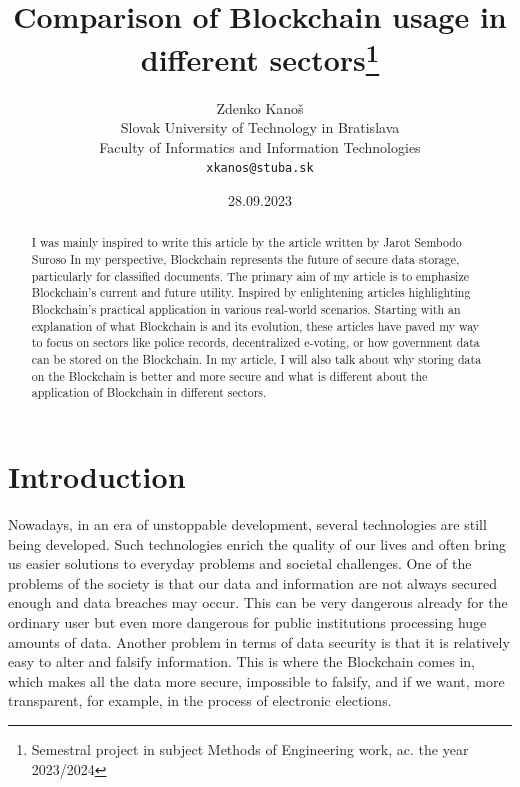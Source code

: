 \documentclass[10pt,english,a4paper]{article}
\title{Comparison of Blockchain usage in different sectors\centering\thanks{Semestral project in subject Methods of Engineering work, ac. the year 2023/2024}}
\author{Zdenko Kanoš\\[2pt]
	{\small Slovak University of Technology in Bratislava}\\
	{\small Faculty of Informatics and Information Technologies}\\
	{\small \texttt{xkanos@stuba.sk}}
	}
\date{\small 28.09.2023}
\begin{document}
\maketitle

\begin{abstract}
I was mainly inspired to write this article by the article written by Jarot Sembodo Suroso\cite{Suroso:SKCK} In my perspective, Blockchain represents the future of secure data storage, particularly for classified documents. The primary aim of my article is to emphasize Blockchain’s current and future utility. Inspired by enlightening articles highlighting Blockchain's practical application in various real-world scenarios. Starting with an explanation of what Blockchain is and its evolution, these articles have paved my way to focus on sectors like police records, decentralized e-voting, or how government data can be stored on the Blockchain. In my article, I will also talk about why storing data on the Blockchain is better and more secure and what is different about the application of Blockchain in different sectors.
\end{abstract}

\section{Introduction}
Nowadays, in an era of unstoppable development, several technologies are still being developed. Such technologies enrich the quality of our lives and often bring us easier solutions to everyday problems and societal challenges. One of the problems of the society is that our data and information are not always secured enough and data breaches may occur. This can be very dangerous already for the ordinary user but even more dangerous for public institutions processing huge amounts of data. Another problem in terms of data security is that it is relatively easy to alter and falsify information.  This is where the Blockchain comes in, which makes all the data more secure, impossible to falsify, and if we want, more transparent, for example, in the process of electronic elections.
\pagebreak
\end{document}
